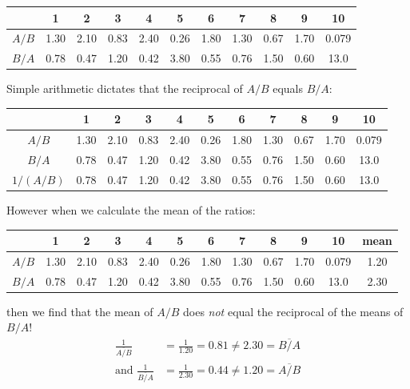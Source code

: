 \begin{center}
  \begin{tabular}{c|cccccccccc}
    & 1 & 2 & 3 & 4 & 5 & 6 & 7 & 8 & 9 & 10 \\ \hline
    $A/B$ & 1.30 & 2.10 & 0.83 & 2.40 & 0.26 &
    1.80 & 1.30 & 0.67 & 1.70 & 0.079 \\
    $B/A$ & 0.78 & 0.47 & 1.20 & 0.42 & 3.80 &
    0.55 & 0.76 & 1.50 & 0.60 & 13.0  \\
  \end{tabular}
\end{center}

Simple arithmetic dictates that the reciprocal of $A/B$ equals $B/A$:

\begin{center}
  \begin{tabular}{c|cccccccccc}
    & 1 & 2 & 3 & 4 & 5 & 6 & 7 & 8 & 9 & 10 \\ \hline
    $A/B$ & 1.30 & 2.10 & 0.83 & 2.40 & 0.26 &
    1.80 & 1.30 & 0.67 & 1.70 & 0.079 \\
    $B/A$ & 0.78 & 0.47 & 1.20 & 0.42 & 3.80 &
    0.55 & 0.76 & 1.50 & 0.60 & 13.0 \\
    $1/(A/B)$ & 0.78 & 0.47 & 1.20 & 0.42 & 3.80 &
    0.55 & 0.76 & 1.50 & 0.60 & 13.0
  \end{tabular}
\end{center}

However when we calculate the mean of the ratios:

\begin{center}
  \begin{tabular}{c|cccccccccc|c}
    & 1 & 2 & 3 & 4 & 5 & 6 & 7 & 8 & 9 & 10 & mean \\ \hline
    $A/B$ & 1.30 & 2.10 & 0.83 & 2.40 & 0.26 & 1.80 &
    1.30 & 0.67 & 1.70 & 0.079 & 1.20 \\
    $B/A$ & 0.78 & 0.47 & 1.20 & 0.42 & 3.80 & 0.55 &
    0.76 & 1.50 & 0.60 & 13.0 & 2.30  \\
  \end{tabular}
\end{center}

then we find that the mean of $A/B$ does \emph{not} equal the
reciprocal of the means of $B/A$!
\[
\begin{split}
  \frac{1}{\overline{A/B}} & = \frac{1}{1.20} = 0.81 \neq 2.30 = \overline{B/A} \\
  \mbox{and~}\frac{1}{\overline{B/A}} & = \frac{1}{2.30} = 0.44 \neq 1.20 = \overline{A/B} \\
\end{split}
\]

